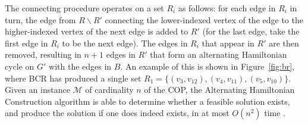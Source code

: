\documentclass{elsarticle}
\begin{document}
The connecting procedure operates on a set $R_i$ as follows: for each edge in $R_i$ in turn, the edge from $R \backslash R'$ connecting the lower-indexed vertex of the edge to the higher-indexed vertex of the next edge is added to $R'$ (for the last edge, take the first edge in $R_i$ to be the next edge). The edges in $R_i$ that appear in $R'$ are then removed, resulting in $n+1$ edges in $R'$ that form an alternating Hamiltonian cycle on $G'$ with the edges in $B$. An example of this is shown in Figure~\ref{fig:br}, where BCR has produced a single set $R_1 = \{(v_3, v_{12}),(v_4, v_{11}), (v_5, v_{10})\}$. Given an instance $\mathcal{M}$ of cardinality $n$ of the COP, the Alternating Hamiltonian Construction algorithm is able to determine whether a feasible solution exists, and produce the solution if one does indeed exists, in at most $O(n^2)$ time \cite{hawa2018}.
\end{document}
